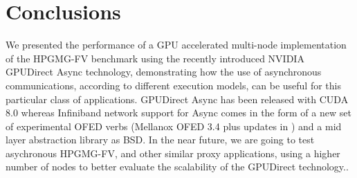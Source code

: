 \documentclass[review]{siamart1116}
\begin{document}
%




\section{Conclusions}

We presented the performance of a GPU accelerated multi-node
implementation of the HPGMG-FV benchmark using the recently introduced
NVIDIA GPUDirect Async technology, demonstrating how the use of asynchronous communications,
according to different execution models, can be useful for this particular class of applications.
%
GPUDirect Async has been
released with CUDA 8.0 whereas Infiniband network support for
Async comes in the form of a new set of experimental
OFED verbs (Mellanox OFED 3.4 plus updates in \cite{libmlx5_async})
and a mid layer abstraction library \cite{libgdsync} as BSD.
%
In the near future,  we are going to test
asychronous HPGMG-FV, and other similar proxy applications, using a higher number of nodes to
better evaluate the scalability of the GPUDirect technology..
\end{document}
